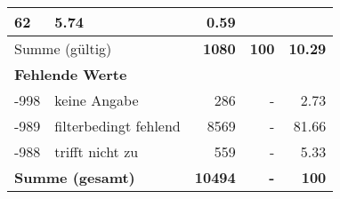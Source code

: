 \begin{longtable}{lXrrr}
       \num{62} &
       \num[round-mode=places,round-precision=2]{5.74} &
         \num[round-mode=places,round-precision=2]{0.59} \\
     \midrule
     \multicolumn{2}{l}{Summe (gültig)} &
       \textbf{\num{1080}} &
     \textbf{\num{100}} &
       \textbf{\num[round-mode=places,round-precision=2]{10.29}} \\
     \multicolumn{5}{l}{\textbf{Fehlende Werte}}\\
       -998 &
       keine Angabe &
         \num{286} &
        - &
         \num[round-mode=places,round-precision=2]{2.73} \\
       -989 &
       filterbedingt fehlend &
         \num{8569} &
        - &
         \num[round-mode=places,round-precision=2]{81.66} \\
       -988 &
       trifft nicht zu &
         \num{559} &
        - &
         \num[round-mode=places,round-precision=2]{5.33} \\
     \midrule
     \multicolumn{2}{l}{\textbf{Summe (gesamt)}} &
          \textbf{\num{10494}} &
        \textbf{-} &
        \textbf{\num{100}} \\
     \bottomrule
     \end{longtable}
     
